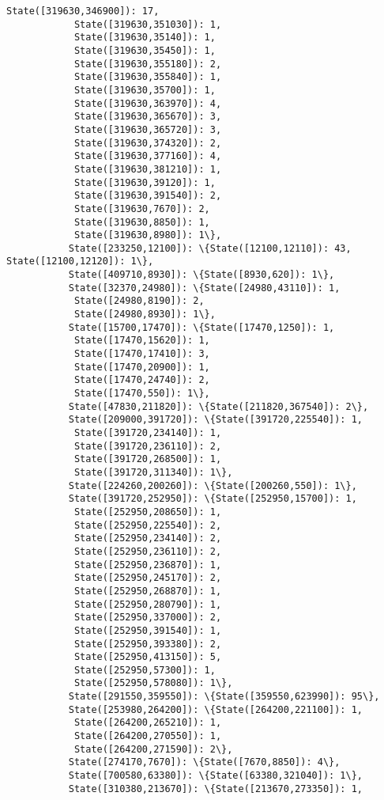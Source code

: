 \documentclass[11pt]{article}
\begin{document}
\begin{Verbatim}[commandchars=\\\{\}]
            State([319630,346900]): 17,
            State([319630,351030]): 1,
            State([319630,35140]): 1,
            State([319630,35450]): 1,
            State([319630,355180]): 2,
            State([319630,355840]): 1,
            State([319630,35700]): 1,
            State([319630,363970]): 4,
            State([319630,365670]): 3,
            State([319630,365720]): 3,
            State([319630,374320]): 2,
            State([319630,377160]): 4,
            State([319630,381210]): 1,
            State([319630,39120]): 1,
            State([319630,391540]): 2,
            State([319630,7670]): 2,
            State([319630,8850]): 1,
            State([319630,8980]): 1\},
           State([233250,12100]): \{State([12100,12110]): 43, State([12100,12120]): 1\},
           State([409710,8930]): \{State([8930,620]): 1\},
           State([32370,24980]): \{State([24980,43110]): 1,
            State([24980,8190]): 2,
            State([24980,8930]): 1\},
           State([15700,17470]): \{State([17470,1250]): 1,
            State([17470,15620]): 1,
            State([17470,17410]): 3,
            State([17470,20900]): 1,
            State([17470,24740]): 2,
            State([17470,550]): 1\},
           State([47830,211820]): \{State([211820,367540]): 2\},
           State([209000,391720]): \{State([391720,225540]): 1,
            State([391720,234140]): 1,
            State([391720,236110]): 2,
            State([391720,268500]): 1,
            State([391720,311340]): 1\},
           State([224260,200260]): \{State([200260,550]): 1\},
           State([391720,252950]): \{State([252950,15700]): 1,
            State([252950,208650]): 1,
            State([252950,225540]): 2,
            State([252950,234140]): 2,
            State([252950,236110]): 2,
            State([252950,236870]): 1,
            State([252950,245170]): 2,
            State([252950,268870]): 1,
            State([252950,280790]): 1,
            State([252950,337000]): 2,
            State([252950,391540]): 1,
            State([252950,393380]): 2,
            State([252950,413150]): 5,
            State([252950,57300]): 1,
            State([252950,578080]): 1\},
           State([291550,359550]): \{State([359550,623990]): 95\},
           State([253980,264200]): \{State([264200,221100]): 1,
            State([264200,265210]): 1,
            State([264200,270550]): 1,
            State([264200,271590]): 2\},
           State([274170,7670]): \{State([7670,8850]): 4\},
           State([700580,63380]): \{State([63380,321040]): 1\},
           State([310380,213670]): \{State([213670,273350]): 1,

\end{Verbatim}
\end{document}
